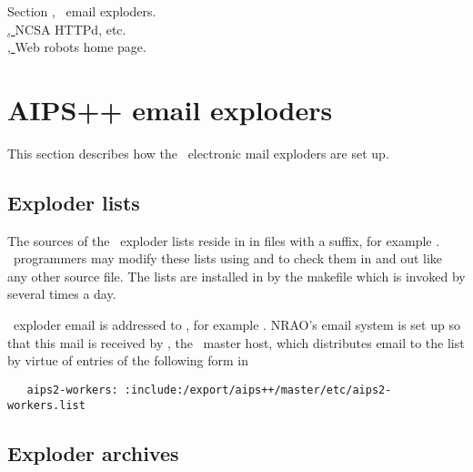 Section , \aipspp\ email exploders.\\
\href{http://hoohoo.ncsa.uiuc.edu}{, }{NCSA HTTPd}, etc.\\
\href{http://info.webcrawler.com/mak/projects/robots/robots.html}{, }
   {Web robots home page}.


\newpage
\section{AIPS++ email exploders}
\label{email exploders}



This section describes how the \aipspp\ electronic mail exploders are set up.

\subsection*{Exploder lists}

The sources of the \aipspp\ exploder lists reside in
 in files with a  suffix, for
example \mbox{}.  \aipspp\ programmers may modify
these lists using  and  to check them in and out like
any other source file.  The lists are installed in  by the
 makefile which is invoked by  several times
a day.

\aipspp\ exploder email is addressed to , for example
\mbox{}.  NRAO's email system is set up so that
this mail is received by , the \aipspp\ master host,
which distributes email to the list by virtue of entries of the following form
in 

\begin{verbatim}
   aips2-workers: :include:/export/aips++/master/etc/aips2-workers.list
\end{verbatim}

\subsection*{Exploder archives}

